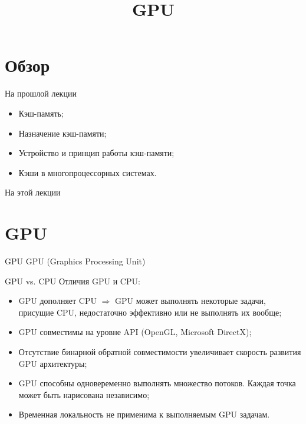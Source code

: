 

\title{GPU}



\begin{frame}
\titlepage
\end{frame}

\section*{Обзор}

\begin{frame}{На прошлой лекции}
\begin{itemize}
\ifsbertech
    \item Кэш-память;
    \item Назначение кэш-памяти;
    \item Устройство и принцип работы кэш-памяти;
    \item Кэши в многопроцессорных системах.
\fi
\end{itemize}
\end{frame}

\begin{frame}{На этой лекции}
\tableofcontents
\end{frame}

\section{GPU}

\begin{frame}{GPU}
GPU (\abbr Graphics Processing Unit)
\end{frame}

\begin{frame}{GPU vs. CPU}
Отличия GPU и CPU:
\begin{itemize}
    \item GPU дополняет CPU $\Rightarrow$ GPU может выполнять некоторые задачи,
    присущие CPU, недостаточно эффективно или не выполнять их вообще;\pause
    \item GPU совместимы на уровне API (OpenGL, Microsoft DirectX);\pause
    \item Отсутствие бинарной обратной совместимости увеличивает скорость
    развития GPU архитектуры;\pause
    \item GPU способны одновеременно выполнять множество потоков. Каждая точка
    может быть нарисована независимо;\pause
    \item Временная локальность не применима к выполняемым GPU задачам.
\end{itemize}
\end{frame}

